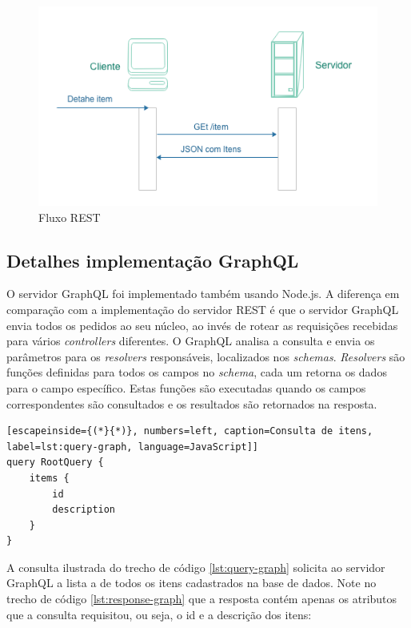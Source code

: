 \begin{figure}[htbp]
\centering
\includegraphics[width=1\textwidth]{figuras/uml-rest.png}
\caption{Fluxo REST}
\label{fig:rest-uml}
\author{fonte: Autor}
\end{figure}

\subsection{Detalhes implementação GraphQL}

O servidor GraphQL foi implementado também usando Node.js. A diferença em comparação com a implementação do servidor REST é que o servidor GraphQL envia todos os pedidos ao seu núcleo, ao invés de rotear as requisições recebidas para vários \textit{controllers} diferentes. O GraphQL analisa a consulta e envia os parâmetros para os \textit{resolvers} responsáveis, localizados nos \textit{schemas}. \textit{Resolvers} são funções definidas para todos os campos no \textit{schema}, cada um retorna os dados para o campo específico. Estas funções são executadas quando os campos correspondentes são consultados e os resultados são retornados na resposta.

\begin{lstlisting}[escapeinside={(*}{*)}, numbers=left, caption=Consulta de itens, label=lst:query-graph, language=JavaScript]]
query RootQuery {
	items {
    	id
    	description
    }
}

\end{lstlisting}

 A consulta ilustrada do trecho de código \ref{lst:query-graph} solicita ao servidor GraphQL a lista a de todos os itens cadastrados na base de dados. Note no trecho de código \ref{lst:response-graph} que a resposta contém apenas os atributos que a consulta requisitou, ou seja, o \textup{id} e a descrição dos itens:

